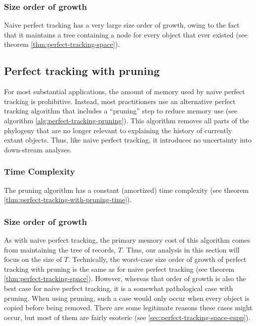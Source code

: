 \subsubsection{Size order of growth}

Naive perfect tracking has a very large size order of growth, owing to the fact that it maintains a tree containing a node for every object that ever existed (see theorem \ref{thm:perfect-tracking-space}).



\subsection{Perfect tracking with pruning}

For most substantial applications, the amount of memory used by naive perfect tracking is prohibitive.
Instead, most practitioners use an alternative perfect tracking algorithm that includes a ``pruning'' step to reduce memory use (see algorithm \ref{alg:perfect-tracking-pruning}).
This algorithm removes all parts of the phylogeny that are no longer relevant to explaining the history of currently extant objects.
Thus, like naive perfect tracking, it introduces no uncertainty into down-stream analyses.



\subsubsection{Time Complexity}

The pruning algorithm has a constant (amortized) time complexity (see theorem \ref{thm:perfect-tracking-with-pruning-time}).



\subsubsection{Size order of growth}

As with naive perfect tracking, the primary memory cost of this algorithm comes from maintaining the tree of records, $T$.
Thus, our analysis in this section will focus on the size of $T$.
Technically, the worst-case size order of growth of perfect tracking with pruning is the same as for naive perfect tracking (see theorem \ref{thm:perfect-tracking-space}).
However, whereas that order of growth is also the best case for naive perfect tracking, it is a somewhat pathological case with pruning.
When using pruning, such a case would only occur when every object is copied before being removed.
There are some legitimate reasons these cases might occur, but most of them are fairly esoteric (see \ref{sec:perfect-tracking-space-supp}).

